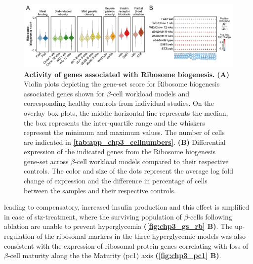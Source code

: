 \begin{figure}[H]
\centering
\includegraphics[width=\linewidth]{Chapter5/Fig/F3-13-03.png}
\caption[Activity of genes associated with ribosome biogenesis]{\textbf{Activity of genes associated with Ribosome biogenesis.} \textbf{(A)} Violin plots depicting the gene-set score for Ribosome biogenesis associated genes shown for $\beta$-cell workload models and corresponding healthy controls from individual studies. On the overlay box plots, the middle horizontal line represents the median, the box represents the inter-quartile range and the whiskers represent the minimum and maximum values. The number of cells are indicated in \textbf{\autoref{tab:app_chp3_cellnumbers}}. \textbf{(B)} Differential expression of the indicated genes from the Ribosome biogenesis gene-set across $\beta$-cell workload models compared to their respective controls. The color and size of the dots represent the average log fold change of expression and the difference in percentage of cells between the samples and their respective controls.}
\label{fig:chp3_gs_rb}
\end{figure}

leading to  compensatory, increased insulin production and this effect is amplified in case of \gls{stz}-treatment, where the surviving population of $\beta$-cells following ablation are unable to prevent hyperglycemia \textbf{(\autoref{fig:chp3_gs_rb} B)}. The up-regulation of the ribosomal markers in the three hyperglycemic models was also consistent with the expression of ribosomal protein genes correlating with loss of $\beta$-cell maturity along the the Maturity (\gls{pc}1) axis \textbf{(\autoref{fig:chp3_pc1} B)}.

